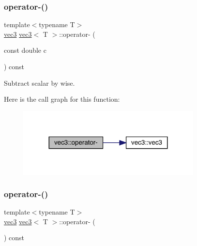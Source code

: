 \subsubsection{\texorpdfstring{operator-\/()}{operator-()}\hspace{0.1cm}{\footnotesize\ttfamily [2/3]}}
{\footnotesize\ttfamily template$<$typename T$>$ \\
\mbox{\hyperlink{structvec3}{vec3}} \mbox{\hyperlink{structvec3}{vec3}}$<$ T $>$\+::operator-\/ (\begin{DoxyParamCaption}\item[{const double}]{c }\end{DoxyParamCaption}) const\hspace{0.3cm}{\ttfamily [inline]}}



Subtract scalar by wise. 

Here is the call graph for this function\+:\nopagebreak
\begin{figure}[H]
\begin{center}
\leavevmode
\includegraphics[width=263pt]{structvec3_a00615545da4a7f61be923dc8c4e0557e_cgraph}
\end{center}
\end{figure}
\mbox{\label{structvec3_a9ee0d5d83bd70141b9424928d0ea9c98}} 
\subsubsection{\texorpdfstring{operator-\/()}{operator-()}\hspace{0.1cm}{\footnotesize\ttfamily [3/3]}}
{\footnotesize\ttfamily template$<$typename T$>$ \\
\mbox{\hyperlink{structvec3}{vec3}} \mbox{\hyperlink{structvec3}{vec3}}$<$ T $>$\+::operator-\/ (\begin{DoxyParamCaption}{ }\end{DoxyParamCaption}) const\hspace{0.3cm}{\ttfamily [inline]}}




